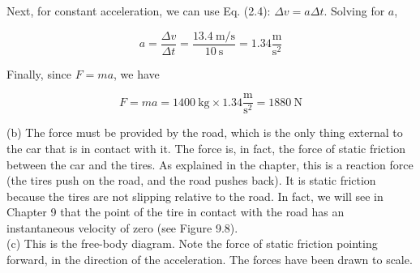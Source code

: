 \documentclass[10pt]{article}
\begin{document}
Next, for constant acceleration, we can use Eq. (2.4): $\Delta v=a \Delta t$. Solving for $a$,

$$
a=\frac{\Delta v}{\Delta t}=\frac{13.4 \mathrm{~m} / \mathrm{s}}{10 \mathrm{~s}}=1.34 \frac{\mathrm{m}}{\mathrm{s}^{2}}
$$

Finally, since $F=m a$, we have

$$
F=m a=1400 \mathrm{~kg} \times 1.34 \frac{\mathrm{m}}{\mathrm{s}^{2}}=1880 \mathrm{~N}
$$

(b) The force must be provided by the road, which is the only thing external to the car that is in contact with it. The force is, in fact, the force of static friction between the car and the tires. As explained in the chapter, this is a reaction force (the tires push on the road, and the road pushes back). It is static friction because the tires are not slipping relative to the road. In fact, we will see in Chapter 9 that the point of the tire in contact with the road has an instantaneous velocity of zero (see Figure 9.8).\\
(c) This is the free-body diagram. Note the force of static friction pointing forward, in the direction of the acceleration. The forces have been drawn to scale.
\end{document}
